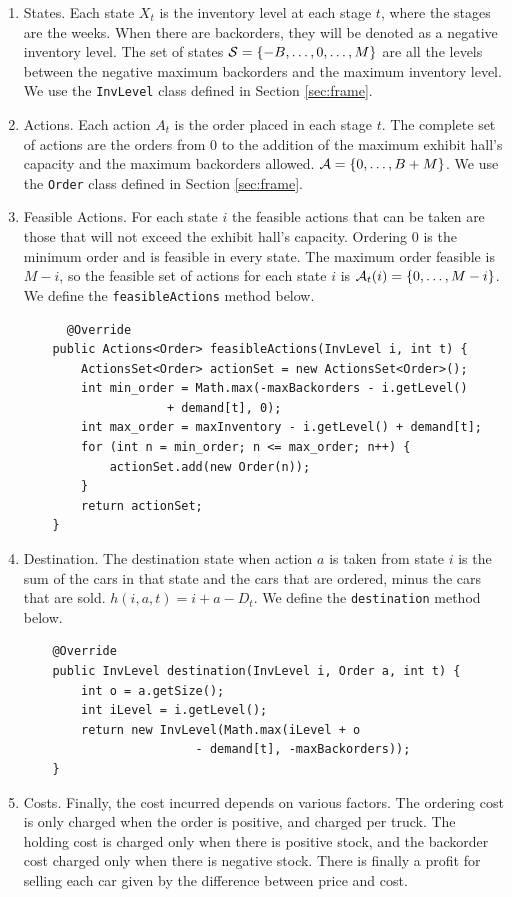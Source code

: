 \documentclass[11pt]{article}
\newcommand {\cA}{\ensuremath \mathcal{A}}
\newcommand {\cS}{\ensuremath \mathcal{S}}
\begin{document}
\begin{enumerate}
  \item States. Each state $X_t$ is the inventory level at each stage $t$, where the stages are the weeks. When there are backorders, they will be denoted as a negative inventory level. The set of states $\cS = \{-B, \ldots, 0, \ldots, M  \}$ are all the levels between the negative maximum backorders and the maximum inventory level. We use the \lstinline!InvLevel! class defined in Section \ref{sec:frame}.
  \item Actions. Each action $A_t$ is the order placed in each stage $t$. The complete set of actions are the orders from 0 to the addition of the maximum exhibit hall's capacity and the maximum backorders allowed. $\cA = \{0,\ldots,B+M\}$. We use the \lstinline!Order! class defined in Section \ref{sec:frame}.
  \item Feasible Actions. For each state $i$ the feasible actions that can be taken are those that will not exceed the exhibit hall's capacity. Ordering 0 is the minimum order and is feasible in every state. The maximum order feasible is $M-i$, so the feasible set of actions for each state $i$ is $\cA_t(i) =\{0,\ldots,M-i\}$. We define the \lstinline!feasibleActions! method below.
  \begin{lstlisting}
      @Override
    public Actions<Order> feasibleActions(InvLevel i, int t) {
        ActionsSet<Order> actionSet = new ActionsSet<Order>();
        int min_order = Math.max(-maxBackorders - i.getLevel() 
        			+ demand[t], 0);
        int max_order = maxInventory - i.getLevel() + demand[t];
        for (int n = min_order; n <= max_order; n++) {
            actionSet.add(new Order(n));
        }
        return actionSet;
    }
    \end{lstlisting}
  \item Destination. The destination state when action $a$ is taken from state $i$ is the sum of the cars in that state and the cars that are ordered, minus the cars that are sold. $h(i,a,t)=i+a-D_t$. We define the \lstinline!destination! method below.
  \begin{lstlisting}
    @Override
    public InvLevel destination(InvLevel i, Order a, int t) {
        int o = a.getSize();
        int iLevel = i.getLevel();
        return new InvLevel(Math.max(iLevel + o 
        				- demand[t], -maxBackorders));
    }
\end{lstlisting}
  
  \item Costs. Finally, the cost incurred depends on various factors. The ordering cost is only charged when the order is positive, and charged per truck. The holding cost is charged only when there is positive stock, and the backorder cost charged only when there is negative stock. There is finally a profit for selling each car given by the difference between price and cost.


\end{enumerate}
\end{document}
